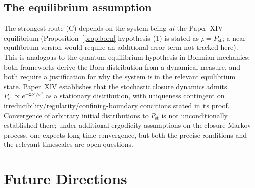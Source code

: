 \documentclass[12pt]{article}
\newcommand{\Fcal}{\mathcal{F}}
\newcommand{\Pst}{P_{\mathrm{st}}}
\begin{document}
\subsection{The equilibrium assumption}

The strongest route (C) depends on the system being \emph{at} the Paper~XIV equilibrium (Proposition~\ref{prop:born} hypothesis~(1) is stated as $\rho = \Pst$; a near-equilibrium version would require an additional error term not tracked here). This is analogous to the quantum-equilibrium hypothesis in Bohmian mechanics: both frameworks derive the Born distribution from a dynamical measure, and both require a justification for why the system is in the relevant equilibrium state. Paper~XIV establishes that the stochastic closure dynamics admits $\Pst \propto e^{-2\Fcal/\sigma^2}$ as a stationary distribution, with uniqueness contingent on irreducibility/regularity/confining-boundary conditions stated in its proof. Convergence of arbitrary initial distributions to $\Pst$ is not unconditionally established there; under additional ergodicity assumptions on the closure Markov process, one expects long-time convergence, but both the precise conditions and the relevant timescales are open questions.

\section{Future Directions}\label{sec:future}
\end{document}
